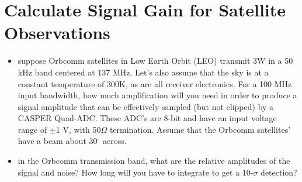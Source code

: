 \documentclass[11pt]{article}
\begin{document}
\section{Calculate Signal Gain for Satellite Observations}
\begin{itemize}
\item suppose Orbcomm satellites in Low Earth Orbit (LEO) transmit 3W in a 50 kHz band centered at 137 MHz.  Let's
also assume that the sky is at a constant temperature of 300K, as are all receiver electronics.  For a 100 MHz
input bandwidth, how much 
amplification will you need in order to produce a signal amplitude that can be effectively sampled (but not
clipped) by
a CASPER Quad-ADC.  These ADC's are 8-bit and have an input voltage range of $\pm$1 V, with 50$\Omega$ termination. 
Assume that the Orbcomm satellites' have a beam about 30$^\circ$ across.
\item in the Orbcomm transmission band, what are the relative amplitudes of the signal and noise?  How long
will you have to integrate to get a 10-$\sigma$ detection?
\end{itemize}
\end{document}
